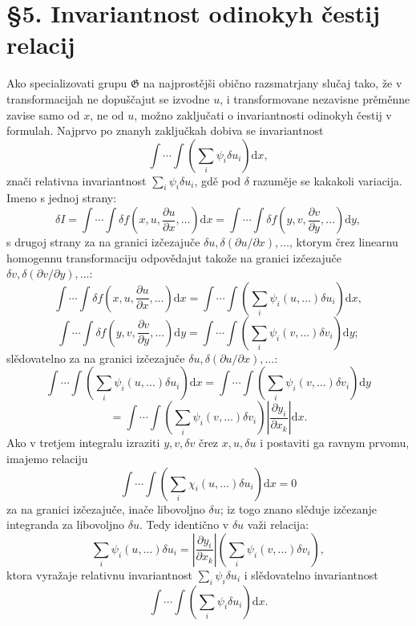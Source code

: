 \documentclass[11pt]{article}
\providecommand{\G}{\mathfrak G}
\providecommand{\p}{\partial}
\providecommand{\dd}{\mathrm d}
\begin{document}
\section*{\S{}5. Invariantnost odinokyh čestij relacij}

Ako specializovati grupu \(\G\) na najprostějši obično razsmatrjany slučaj tako, že v transformacijah ne dopuščajut se izvodne \(u\), i transformovane nezavisne prěměnne zavise samo od \(x\), ne od \(u\), možno zaključati o invariantnosti odinokyh čestij v formulah. Najprvo po znanyh zaključkah dobiva se invariantnost
\[
\int\!\cdots\!\int\left(\sum_i\psi_i\delta u_i\right)\dd x,
\]
znači relativna invariantnost \(\sum_i\psi_i\delta u_i\), gdě pod \(\delta\) razuměje se kakakoli variacija. Imeno s jednoj strany:
\[
\delta I
=\int\!\cdots\!\int \delta f\!\left(x,u,\frac{\p u}{\p x},\ldots\right)\dd x
=\int\!\cdots\!\int \delta f\!\left(y,v,\frac{\p v}{\p y},\ldots\right)\dd y,
\]
s drugoj strany za na granici izčezajuče \(\delta u,\delta(\p u/\p x),\ldots\), ktorym črez linearnu homogennu transformaciju odpovědajut takože na granici izčezajuče \(\delta v,\delta(\p v/\p y),\ldots\):
\[
\int\!\cdots\!\int \delta f\!\left(x,u,\frac{\p u}{\p x},\ldots\right)\dd x
=
\int\!\cdots\!\int\left(\sum_i\psi_i(u,\ldots)\delta u_i\right)\dd x,
\]
\[
\int\!\cdots\!\int \delta f\!\left(y,v,\frac{\p v}{\p y},\ldots\right)\dd y
=
\int\!\cdots\!\int\left(\sum_i\psi_i(v,\ldots)\delta v_i\right)\dd y;
\]
slědovatelno za na granici izčezajuče \(\delta u,\delta(\p u/\p x),\ldots\):
\[
\int\!\cdots\!\int\left(\sum_i\psi_i(u,\ldots)\delta u_i\right)\dd x
=
\int\!\cdots\!\int\left(\sum_i\psi_i(v,\ldots)\delta v_i\right)\dd y
\]
\[
=
\int\!\cdots\!\int\left(\sum_i\psi_i(v,\ldots)\delta v_i\right)
\left|\frac{\p y_i}{\p x_k}\right|\dd x.
\]
Ako v tretjem integralu izraziti \(y,v,\delta v\) črez \(x,u,\delta u\) i postaviti ga ravnym prvomu, imajemo relaciju
\[
\int\!\cdots\!\int\left(\sum_i\chi_i(u,\ldots)\delta u_i\right)\dd x=0
\]
za na granici izčezajuče, inače libovoljno \(\delta u\); iz togo znano slěduje izčezanje integranda za libovoljno \(\delta u\). Tedy identično v \(\delta u\) važi relacija:
\[
\sum_i\psi_i(u,\ldots)\delta u_i
=
\left|\frac{\p y_i}{\p x_k}\right|
\left(\sum_i\psi_i(v,\ldots)\delta v_i\right),
\]
ktora vyražaje relativnu invariantnost \(\sum_i\psi_i\delta u_i\) i slědovatelno invariantnost
\[
\int\!\cdots\!\int\left(\sum_i\psi_i\delta u_i\right)\dd x.
\]
\end{document}
